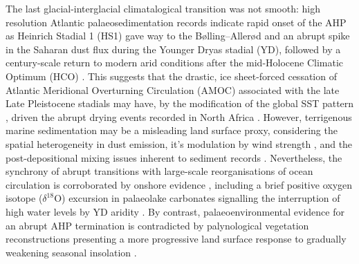 \documentclass[a4paper]{article}
\newcommand{\delO}{\ensuremath{\delta ^{18}}O}
\begin{document}
The last glacial-interglacial climatalogical transition was not smooth: high resolution Atlantic palaeosedimentation records indicate rapid onset of the AHP as Heinrich Stadial 1 (HS1) gave way to the Bølling–Allerød and an abrupt spike in the Saharan dust flux during the Younger Dryas stadial (YD), followed by a century-scale return to modern arid conditions after the mid-Holocene Climatic Optimum (HCO) \parencite{demenocal2000abrupt, kuhlmann2004transition, adkins2006african, mcgee2013magnitude, ehrmann2013dynamics, collins2013abrupt, williams2016glacial}.
This suggests that the drastic, ice sheet-forced cessation of Atlantic Meridional Overturning Circulation (AMOC) associated with the late Late Pleistocene stadials \parencite{mcmanus2004collapse, lynch2017atlantic, ritz2013estimated} may have, by the modification of the global SST pattern \parencite{boyle1987north, kiefer2005patterns, kienast2006eastern, barker2009interhemispheric}, driven the abrupt drying events recorded in North Africa \parencite{weldeab2007155, mulitza2008sahel, collins2013abrupt}. 
However, terrigenous marine sedimentation may be a misleading land surface proxy, considering the spatial heterogeneity in dust emission, it's modulation by wind strength \parencite{ruddiman1997tropical, mcgee2010gustiness, parker2016new}, and the post-depositional mixing issues inherent to sediment records \parencite{mahowald1999dust, giresse2003late, maslin2003evidence}.
Nevertheless, the synchrony of abrupt transitions with large-scale reorganisations of ocean circulation is corroborated by onshore evidence \parencite{gasse1994abrupt, garcin2007abrupt, talbot2007abrupt}, including a brief positive oxygen isotope (\delO) excursion in palaeolake carbonates signalling the interruption of high water levels by YD aridity \parencite{gasse1990arid}.
By contrast, palaeoenvironmental evidence for an abrupt AHP termination \parencite{gasse1990arid, salzmann2005dahomey, tierney2013abrupt, tierney2017rainfall} is contradicted by palynological vegetation reconstructions presenting a more progressive land surface response to gradually weakening seasonal insolation \parencite{kropelin2008climate, lezine2009timing, vincens2010vegetation, amaral2013palynological, shanahan2015time}. 
\end{document}
